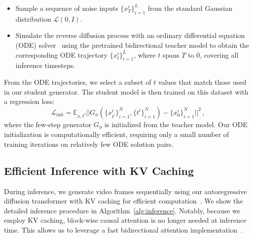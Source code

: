 \begin{itemize} 
    \item Sample a sequence of noise inputs $\{x_T^{i}\}_{i=1}^{L}$ from the standard Gaussian distribution $\mathcal{L}(0, I)$. 
    \item Simulate the reverse diffusion process with an ordinary differential equation (ODE) solver~\cite{song2020denoising} using the pretrained bidirectional teacher model to obtain the corresponding ODE trajectory $\{x_t^{i}\}_{i=1}^{L}$, where $t$ spans $T$ to $0$, covering all inference timesteps.  
\end{itemize}


\noindent 
From the ODE trajectories, we select a subset of $t$ values that match those used in our student generator. 
The student model is then trained on this dataset with a regression loss:
\begin{equation} \mathcal{L}_{\text{init}} = \mathbb{E}_{x,t^i}  || G_{\phi}(\{x^i_{t^i}\}_{i=1}^N, \{t^i\}_{i=1}^N) - \{x^i_0\}_{i=1}^N ||^2\,,
\end{equation}
where the few-step generator $G_{\phi}$ is initialized from the teacher model.
Our ODE initialization is computationally efficient, requiring only a small number of training iterations on relatively few ODE solution pairs. 

\subsection{Efficient Inference with KV Caching}
\label{sec:kv_cache}

During inference, we generate video frames sequentially using our autoregressive diffusion transformer with KV caching for efficient computation~\cite{brown2020language}. 
We show the detailed inference procedure in Algorithm~\ref{alg:inference}. 
Notably, because we employ KV caching, block-wise causal attention is no longer needed at inference time. 
This allows us to leverage a fast bidirectional attention implementation~\cite{dao2022flashattention}.



    


    


